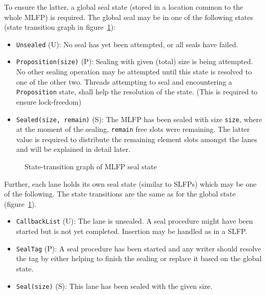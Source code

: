 \documentclass[runningheads,a4paper,fleqn]{llncs}
\begin{document}
To ensure the latter, a global seal state (stored in a location common
to the whole MLFP) is required. The global seal may be in one of the
following states (state transition graph in
figure~\ref{fig:seal-states}):
\begin{itemize}
\item \verb+Unsealed+ (U): No seal has yet been attempted, or all
  seals have failed.
\item \verb+Proposition(size)+ (P): Sealing with given (total) size is
  being attempted. No other sealing operation may be attempted until
  this state is resolved to one of the other two. Threads attempting
  to seal and encountering a \verb+Proposition+ state, shall help the
  resolution of the state. (This is required to ensure lock-freedom)
\item \verb+Sealed(size, remain)+ (S): The MLFP has been sealed with
  size \verb+size+, where at the moment of the sealing, \verb+remain+
  free slots were remaining. The latter value is required to
  distribute the remaining element slots amongst the lanes and will be
  explained in detail later.
\end{itemize}

\begin{figure}
  \centering
  \caption{State-transition graph of MLFP seal state}
  \label{fig:seal-states}
\end{figure}

Further, each lane holds its own seal state (similar to SLFPs) which
may be one of the following. The state transitions are the same as for
the global state (figure~\ref{fig:seal-states}).
\begin{itemize}
\item \verb+CallbackList+ (U): The lane is unsealed. A seal procedure
  might have been started but is not yet completed. Insertion may be
  handled as in a SLFP.
\item \verb+SealTag+ (P): A seal procedure has been started and any
  writer should resolve the tag by either helping to finish the
  sealing or replace it based on the global state.
\item \verb+Seal(size)+ (S): This lane has been sealed with the given 
  size.
\end{itemize}
\end{document}
